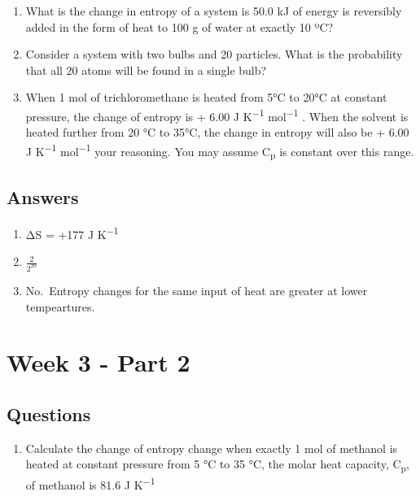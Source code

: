 \documentclass[
]{book}
\providecommand{\tightlist}{%
  \setlength{\itemsep}{0pt}\setlength{\parskip}{0pt}}
\begin{document}
\begin{enumerate}
\def\labelenumi{\arabic{enumi}.}
\item
  What is the change in entropy of a system is 50.0 kJ of energy is reversibly added in the form of heat to 100 g of water at exactly 10 ºC?
\item
  Consider a system with two bulbs and 20 particles. What is the probability that all 20 atoms will be found in a single bulb?
\item
  When 1 mol of trichloromethane is heated from 5°C to 20°C at constant pressure, the
  change of entropy is + 6.00 J K\textsuperscript{−1} mol\textsuperscript{−1} . When the solvent is heated further from 20 °C to 35°C, the change in entropy will also be + 6.00 J K\textsuperscript{−1} mol\textsuperscript{−1} your reasoning. You may assume C\textsubscript{p} is constant over this range.
\end{enumerate}

\hypertarget{sec:w3p1ans}{%
\section{Answers}\label{sec:w3p1ans}}

\begin{enumerate}
\def\labelenumi{\arabic{enumi}.}
\item
  ΔS = +177 J K\textsuperscript{−1}
\item
  \(\frac{2}{2^{20}}\)
\item
  No.~Entropy changes for the same input of heat are greater at lower tempeartures.
\end{enumerate}

\hypertarget{ch:Part6}{%
\chapter{Week 3 - Part 2}\label{ch:Part6}}

\hypertarget{sec:w3p2question}{%
\section{Questions}\label{sec:w3p2question}}

\begin{enumerate}
\def\labelenumi{\arabic{enumi}.}
\tightlist
\item
  Calculate the change of entropy change when exactly 1 mol of methanol is heated at constant pressure from 5 °C to 35 °C, the molar heat capacity, C\textsubscript{p}, of methanol is 81.6 J K\textsuperscript{−1}
\end{enumerate}
\end{document}

